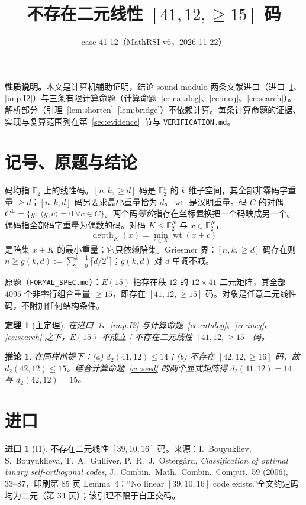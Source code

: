 \documentclass[11pt]{ctexart}
\title{不存在二元线性 $[41,12,\ge 15]$ 码}
\author{case 41-12（MathRSI v6，2026-11-22）}
\date{}
\newtheorem{theorem}{定理}
\newtheorem{corollary}{推论}
\theoremstyle{definition}
\newtheorem{import}{进口}
\newcommand{\F}{\mathbb{F}_2}
\newcommand{\wt}{\operatorname{wt}}
\newcommand{\depth}{\operatorname{depth}}
\begin{document}
\maketitle

\noindent\textbf{性质说明。}本文是计算机辅助证明，结论 sound modulo 两条文献进口（进口~\ref{imp:I1}、\ref{imp:I2}）与三条有限计算命题（计算命题~\ref{cc:catalog}、\ref{cc:ineq}、\ref{cc:search}）。解析部分（引理~\ref{lem:shorten}--\ref{lem:bridge}）不依赖计算。每条计算命题的证据、实现与复算范围列在第~\ref{sec:evidence}~节与 \texttt{VERIFICATION.md}。

\section{记号、原题与结论}

码均指 $\F$ 上的线性码。$[n,k,\ge d]$ 码是 $\F^n$ 的 $k$ 维子空间，其全部非零码字重量 $\ge d$；$[n,k,d]$ 码另要求最小重量恰为 $d$。$\wt$ 是汉明重量。码 $C$ 的对偶 $C^\perp=\{y:\ \langle y,c\rangle=0\ \forall c\in C\}$。两个码\emph{等价}指存在坐标置换把一个码映成另一个。偶码指全部码字重量为偶数的码。对码 $K\le\F^N$ 与 $x\in\F^N$，
\[
\depth_K(x)=\min_{c\in K}\wt(x+c)
\]
是陪集 $x+K$ 的最小重量；它只依赖陪集。Griesmer 界：$[n,k,\ge d]$ 码存在则 $n\ge g(k,d):=\sum_{i=0}^{k-1}\lceil d/2^i\rceil$；$g(k,d)$ 对 $d$ 单调不减。

原题（\texttt{FORMAL\_SPEC.md}）：$E(15)$ 指存在秩 $12$ 的 $12\times 41$ 二元矩阵，其全部 $4095$ 个非零行组合重量 $\ge 15$，即存在 $[41,12,\ge15]$ 码。对象是任意二元线性码，不附加任何结构条件。

\begin{theorem}[主定理]\label{thm:main}
在进口~\ref{imp:I1}、\ref{imp:I2} 与计算命题~\ref{cc:catalog}、\ref{cc:ineq}、\ref{cc:search} 之下，$E(15)$ 不成立：不存在二元线性 $[41,12,\ge 15]$ 码。
\end{theorem}

\begin{corollary}\label{cor:bounds}
在同样前提下：(a) $d_2(41,12)\le 14$；(b) 不存在 $[42,12,\ge16]$ 码，故 $d_2(42,12)\le 15$。结合计算命题~\ref{cc:seed} 的两个显式矩阵得 $d_2(41,12)=14$ 与 $d_2(42,12)=15$。
\end{corollary}

\section{进口}

\begin{import}[I1]\label{imp:I1}
不存在二元线性 $[39,10,16]$ 码。来源：I.~Bouyukliev, S.~Bouyuklieva, T.~A.~Gulliver, P.~R.~J.~\"Osterg\aa rd, \emph{Classification of optimal binary self-orthogonal codes}, J.\ Combin.\ Math.\ Combin.\ Comput.\ 59 (2006), 33--87，印刷第 85 页 Lemma~4：``No linear $[39,10,16]$ code exists.''全文约定码均为二元（第 34 页）；该引理不限于自正交码。
\end{import}
\end{document}
